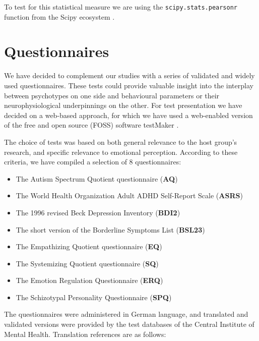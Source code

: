 	    To test for this statistical measure we are using the \colorbox{vlg}{\texttt{scipy.stats.pearsonr}} function from the Scipy ecosystem \citep{scipy,Oliphant2007}.
    \section{Questionnaires}
	We have decided to complement our studies with a series of validated and widely used questionnaires.
	These tests could provide valuable insight into the interplay between psychotypes on one side and behavioural parameters or their neurophysiological underpinnings on the other.
	For test presentation we have decided on a web-based approach, for which we have used a web-enabled version of the free and open source (FOSS) software testMaker \citep{testmaker}.
	
	The choice of tests was based on both general relevance to the host group's research, and specific relevance to emotional perception.
	According to these criteria, we have compiled a selection of 8 questionnaires:
	\begin{itemize}
	    \item The Autism Spectrum Quotient questionnaire (\textbf{AQ}) \citep{Baron-Cohen2001}
	    \item The World Health Organization Adult ADHD Self-Report Scale (\textbf{ASRS}) \citep{Kessler2005}
	    \item The 1996 revised Beck Depression Inventory (\textbf{BDI2}) \citep{Beck1996}
	    \item The short version of the Borderline Symptoms List (\textbf{BSL23}) \citep{Bohus2009}
	    \item The Empathizing Quotient questionnaire (\textbf{EQ}) \citep{Baron-Cohen2004}
	    \item The Systemizing Quotient questionnaire (\textbf{SQ}) \citep{Baron-Cohen2003a}
	    \item The Emotion Regulation Questionnaire (\textbf{ERQ}) \citep{Gross2003}
	    \item The Schizotypal Personality Questionnaire (\textbf{SPQ}) \citep{Raine1991}
	\end{itemize}
	The questionnaires were administered in German language, and translated and validated versions were provided by the test databases of the Central Institute of Mental Health.
	Translation references are as follows:
